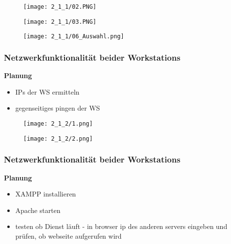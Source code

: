     \begin{figure}
        \centering
        \texttt{[image: 2\_1\_1/02.PNG]}
    \end{figure}

    \begin{figure}
        \centering
        \texttt{[image: 2\_1\_1/03.PNG]}
    \end{figure}

    \begin{figure}
        \centering
        \texttt{[image: 2\_1\_1/06\_Auswahl.png]}
    \end{figure}


\subsubsection{Netzwerkfunktionalität beider Workstations}
    \textbf{Planung}
    \begin{itemize}
        \item IPs der WS ermitteln
        \item gegenseitiges pingen der WS
    \end{itemize}

    \begin{figure}
        \centering
        \texttt{[image: 2\_1\_2/1.png]}
    \end{figure}

    \begin{figure}
        \centering
        \texttt{[image: 2\_1\_2/2.png]}
    \end{figure}


\subsubsection{Netzwerkfunktionalität beider Workstations}
    \textbf{Planung}
    \begin{itemize}
        \item XAMPP installieren 
        \item Apache starten
        \item testen ob Dienst läuft - in browser ip des anderen servers eingeben und prüfen, ob webseite aufgerufen wird 
    \end{itemize}

